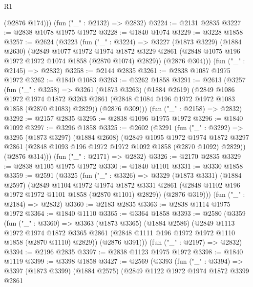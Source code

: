 \begin{lexlean}{R1}
\begin{coremodule}
        (@2876 @174)))
    (fun ("_" : @2132) => @2832)
@3224 := @2131 @2835
@3227 := @2838 @1078 @1975 @1972
@3228 := @1840 @1074
@3229 := @3228 @1858
@3257 := @2624
    (@3223
      (fun ("_" : @3224) =>
      @3227
        (@1873 @3229)
        (@1884 @2630)
        (@2849
          @1077
          @1972
          @1974
          @1872
          @3229
          @2861
          (@2848 @1075 @196 @1972 @1972 @1074 @1858 (@2870 @1074) @2829))
        (@2876 @304)))
    (fun ("_" : @2145) => @2832)
@3258 := @2144 @2835
@3261 := @2838 @1087 @1975 @1972
@3262 := @1840 @1083
@3263 := @3262 @1858
@3291 := @2613
    (@3257
      (fun ("_" : @3258) =>
      @3261
        (@1873 @3263)
        (@1884 @2619)
        (@2849
          @1086
          @1972
          @1974
          @1872
          @3263
          @2861
          (@2848 @1084 @196 @1972 @1972 @1083 @1858 (@2870 @1083) @2829))
        (@2876 @309)))
    (fun ("_" : @2158) => @2832)
@3292 := @2157 @2835
@3295 := @2838 @1096 @1975 @1972
@3296 := @1840 @1092
@3297 := @3296 @1858
@3325 := @2602
    (@3291
      (fun ("_" : @3292) =>
      @3295
        (@1873 @3297)
        (@1884 @2608)
        (@2849
          @1095
          @1972
          @1974
          @1872
          @3297
          @2861
          (@2848 @1093 @196 @1972 @1972 @1092 @1858 (@2870 @1092) @2829))
        (@2876 @314)))
    (fun ("_" : @2171) => @2832)
@3326 := @2170 @2835
@3329 := @2838 @1105 @1975 @1972
@3330 := @1840 @1101
@3331 := @3330 @1858
@3359 := @2591
    (@3325
      (fun ("_" : @3326) =>
      @3329
        (@1873 @3331)
        (@1884 @2597)
        (@2849
          @1104
          @1972
          @1974
          @1872
          @3331
          @2861
          (@2848 @1102 @196 @1972 @1972 @1101 @1858 (@2870 @1101) @2829))
        (@2876 @319)))
    (fun ("_" : @2184) => @2832)
@3360 := @2183 @2835
@3363 := @2838 @1114 @1975 @1972
@3364 := @1840 @1110
@3365 := @3364 @1858
@3393 := @2580
    (@3359
      (fun ("_" : @3360) =>
      @3363
        (@1873 @3365)
        (@1884 @2586)
        (@2849
          @1113
          @1972
          @1974
          @1872
          @3365
          @2861
          (@2848 @1111 @196 @1972 @1972 @1110 @1858 (@2870 @1110) @2829))
        (@2876 @391)))
    (fun ("_" : @2197) => @2832)
@3394 := @2196 @2835
@3397 := @2838 @1123 @1975 @1972
@3398 := @1840 @1119
@3399 := @3398 @1858
@3427 := @2569
    (@3393
      (fun ("_" : @3394) =>
      @3397
        (@1873 @3399)
        (@1884 @2575)
        (@2849
          @1122
          @1972
          @1974
          @1872
          @3399
          @2861

\end{coremodule}
\end{lexlean}
